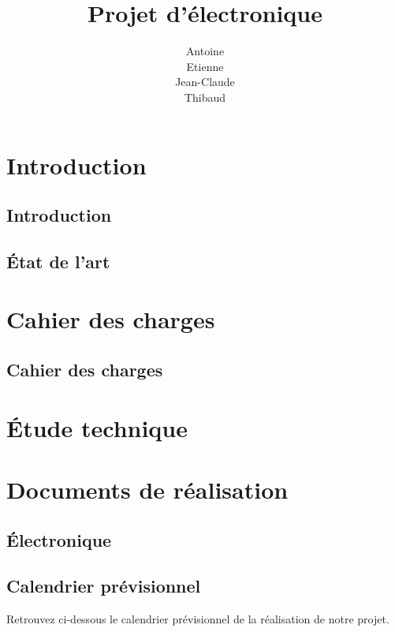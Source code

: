 \documentclass[12pt,titlepage,a4paper]{report}
\title{Projet d'électronique}
\author{Antoine \bsc{Augusti}\\ Etienne \bsc{Batise}\\ Jean-Claude \bsc{Bernard}\\ Thibaud \bsc{Dauce}}
\begin{document}

	\dominitoc
	\tableofcontents

	\setcounter{page}{1}

	
	\part{Introduction}
        \chapter{Introduction}
		

		\chapter{État de l'art}
		\minitoc
		


	\part{Cahier des charges}
		\chapter{Cahier des charges}
		


	\part{Étude technique}
		


	\part{Documents de réalisation}
		\chapter{Électronique}
		\minitoc
		
	
		\chapter{Calendrier prévisionnel}
		Retrouvez ci-dessous le calendrier prévisionnel de la réalisation de notre projet.
		
	
\end{document}
